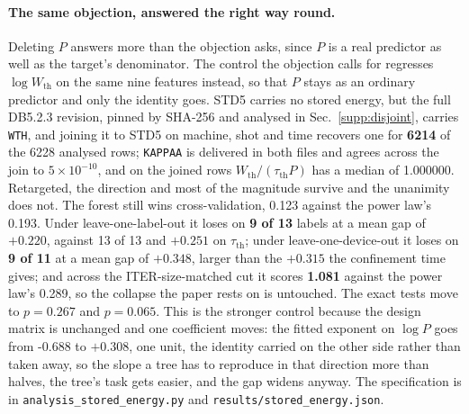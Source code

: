 \documentclass[12pt,letterpaper]{article}
\begin{document}
\paragraph{The same objection, answered the right way round.} Deleting $P$
answers more than the objection asks, since $P$ is a real predictor as well as
the target's denominator. The control the objection calls for regresses
$\log W_{\mathrm{th}}$ on the same nine features instead, so that $P$ stays as
an ordinary predictor and only the identity goes. STD5 carries no stored
energy, but the full DB5.2.3 revision, pinned by SHA-256 and analysed in
Sec.~\ref{supp:disjoint}, carries \texttt{WTH}, and joining it to
STD5 on machine, shot and time recovers one for \textbf{6214} of the 6228
analysed rows; \texttt{KAPPAA} is delivered in both files and agrees across the
join to $5\times10^{-10}$, and on the joined rows
$W_{\mathrm{th}}/(\tau_{\mathrm{th}}P)$ has a median of 1.000000. Retargeted,
the direction and most of the magnitude survive and the unanimity does not. The
forest still wins cross-validation, 0.123 against the power law's 0.193. Under
leave-one-label-out it loses on \textbf{9 of 13} labels at a mean gap of
$+0.220$, against 13 of 13 and $+0.251$ on $\tau_{\mathrm{th}}$; under
leave-one-device-out it loses on \textbf{9 of 11} at a mean gap of
\textbf{$+0.348$}, larger than the $+0.315$ the confinement time gives; and
across the ITER-size-matched cut it scores \textbf{1.081} against the power
law's 0.289, so the collapse the paper rests on is untouched. The exact tests
move to $p=0.267$ and $p=0.065$. This is the stronger control because the design
matrix is unchanged and one coefficient moves: the fitted exponent on $\log P$
goes from -0.688 to $+0.308$, one unit, the identity carried on the other side
rather than taken away, so the slope a tree has to reproduce in that direction
more than halves, the tree's task gets easier, and the gap widens anyway. The specification is in \texttt{analysis\_stored\_energy.py} and
\texttt{results/stored\_energy.json}.
\end{document}
